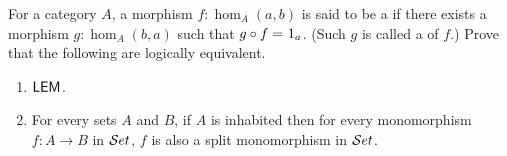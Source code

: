 \begin{ex}\label{ex:monos-are-split-monos-iff-LEM-holds}
  For a category $A$, a morphism $f: \hom_A(a,b)$ is said to be a  if there exists a morphism $g: \hom_A(b,a)$ such that $g \circ f =_{} 1_a$. (Such $g$ is called a  of $f$.)
  Prove that the following are logically equivalent.
  \begin{enumerate}
  \item $\mathsf{LEM}_{}$.
  \item For every sets $A$ and $B$, if $A$ is inhabited then for every monomorphism $f: A \to B$ in $\mathcal{S}et$, $f$ is also a split monomorphism in $\mathcal{S}et$.
  \end{enumerate}
\end{ex}

%

